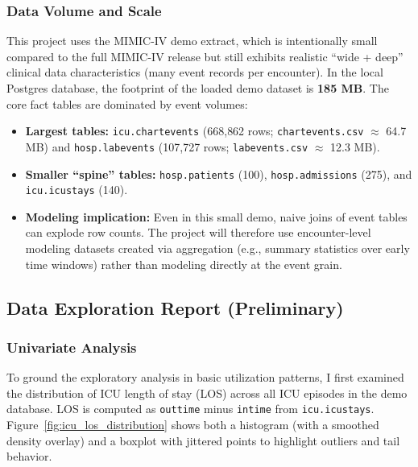 \documentclass[12pt]{article}
\begin{document}
\subsubsection{Data Volume and Scale}

This project uses the MIMIC-IV demo extract, which is intentionally small compared to the full MIMIC-IV release but still exhibits realistic ``wide + deep'' clinical data characteristics (many event records per encounter). In the local Postgres database, the footprint of the loaded demo dataset is \textbf{185 MB}. The core fact tables are dominated by event volumes:


\begin{itemize}
  \item \textbf{Largest tables:} \texttt{icu.chartevents} (668{,}862 rows; \texttt{chartevents.csv} $\approx$ 64.7 MB) and \texttt{hosp.labevents} (107{,}727 rows; \texttt{labevents.csv} $\approx$ 12.3 MB).
  \item \textbf{Smaller ``spine'' tables:} \texttt{hosp.patients} (100), \texttt{hosp.admissions} (275), and \texttt{icu.icustays} (140).
  \item \textbf{Modeling implication:} Even in this small demo, naive joins of event tables can explode row counts. The project will therefore use encounter-level modeling datasets created via aggregation (e.g., summary statistics over early time windows) rather than modeling directly at the event grain.
\end{itemize}


\newpage
\subsection{Data Exploration Report (Preliminary)}
\label{subsec:data_exploration}

%
%

\subsubsection*{Univariate Analysis}
To ground the exploratory analysis in basic utilization patterns, I first examined the
distribution of ICU length of stay (LOS) across all ICU episodes in the demo database.
LOS is computed as \texttt{outtime} minus \texttt{intime} from \texttt{icu.icustays}.
Figure~\ref{fig:icu_los_distribution} shows both a histogram (with a smoothed density
overlay) and a boxplot with jittered points to highlight outliers and tail behavior.
\end{document}
